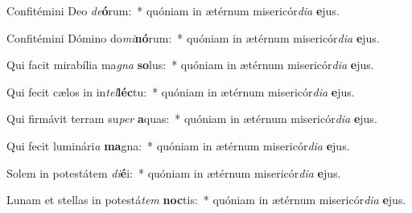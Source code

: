 \item Confitémini Deo \textit{de}\textbf{ó}rum:~* quóniam in ætérnum misericór\textit{di}\textit{a} \textbf{e}jus.
\item Confitémini Dómino do\textit{mi}\textbf{nó}rum:~* quóniam in ætérnum misericór\textit{di}\textit{a} \textbf{e}jus.
\item Qui facit mirabília ma\textit{gna} \textbf{so}lus:~* quóniam in ætérnum misericór\textit{di}\textit{a} \textbf{e}jus.
\item Qui fecit cælos in in\textit{tel}\textbf{léc}tu:~* quóniam in ætérnum misericór\textit{di}\textit{a} \textbf{e}jus.
\item Qui firmávit terram su\textit{per} \textbf{a}quas:~* quóniam in ætérnum misericór\textit{di}\textit{a} \textbf{e}jus.
\item Qui fecit luminári\textit{a} \textbf{ma}gna:~* quóniam in ætérnum misericór\textit{di}\textit{a} \textbf{e}jus.
\item Solem in potestátem \textit{di}\textbf{é}i:~* quóniam in ætérnum misericór\textit{di}\textit{a} \textbf{e}jus.
\item Lunam et stellas in potestá\textit{tem} \textbf{noc}tis:~* quóniam in ætérnum misericór\textit{di}\textit{a} \textbf{e}jus.
